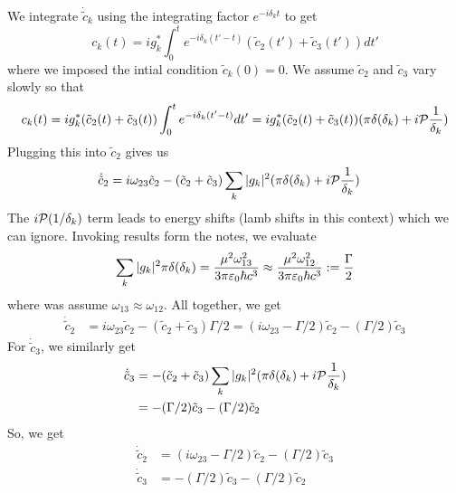 \documentclass[12pt]{article}
\begin{document}
\begin{ans}
\begin{align*}
    \end{align*}
    We integrate $\dot{\tilde c}_k$ using the integrating factor $e^{-i\delta_k t}$ to get 
    \[c_k(t) = i g_k^*\int_0^t e^{-i\delta_k(t' - t)}(\tilde c_2(t') + \tilde c_3(t')) dt'\]
    where we imposed the intial condition $\tilde c_k(0) = 0$. We assume $\tilde c_2$ and $\tilde c_3$ vary slowly so that
    \[c_k(t) = i g_k^*(\tilde c_2(t) + \tilde c_3(t))\int_0^t e^{-i\delta_k(t' - t)} dt' = ig_k^*(\tilde c_2(t) + \tilde c_3(t))(\pi \delta(\delta_k) + i \mathcal{P} \frac1{\delta_k})\]  
    Plugging this into $\tilde c_2$ gives us 
    \begin{align*}
        \dot{\tilde c}_2 &= i\omega_{23} \tilde c_2 - (\tilde c_2 + \tilde c_3)\sum_k |g_k|^2(\pi \delta(\delta_k) + i \mathcal{P} \frac1{\delta_k})
    \end{align*}
    The $i\mathcal{P}(1/\delta_k)$ term leads to energy shifts (lamb shifts in this context) which we can ignore. Invoking results form the notes, we evaluate 
    \[\sum_k |g_k|^2\pi \delta(\delta_k) = \frac{\mu^2\omega_{13}^2}{3\pi\varepsilon_0\hbar c^3} \approx \frac{\mu^2\omega_{12}^2}{3\pi\varepsilon_0\hbar c^3} := \frac{\Gamma}{2}\]
    where was assume $\omega_13 \approx \omega_12$. All together, we get 
    \begin{align*}
        \dot{\tilde c}_2 &= i\omega_{23}\tilde c_2 - (\tilde c_2 + \tilde c_3)\Gamma/2 = (i\omega_{23} - \Gamma/2)\tilde c_2 - (\Gamma/2)\tilde c_3
    \end{align*}
    For $\dot{\tilde c}_3$, we similarly get 
    \begin{align*}
        \dot{\tilde c}_3 &=  -(\tilde c_2 + \tilde c_3)\sum_k |g_k|^2(\pi \delta(\delta_k) + i \mathcal{P} \frac1{\delta_k})\\ 
        &= -(\Gamma/2)\tilde c_3 - (\Gamma/2)\tilde c_2
    \end{align*}
    So, we get 
    \begin{subequations}
        \label{eqn:c2_c3_eoms}
        \begin{align}
            \dot{\tilde c}_2 &=  (i\omega_{23} - \Gamma/2)\tilde c_2 - (\Gamma/2)\tilde c_3 \\ 
        \dot{\tilde c}_3 &= -(\Gamma/2)\tilde c_3 - (\Gamma/2)\tilde c_2
        \end{align}
    \end{subequations}
\end{ans}
\end{document}
